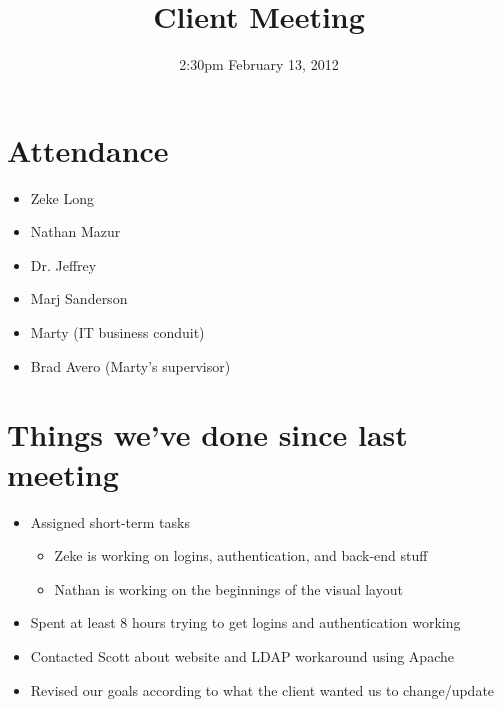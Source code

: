 \documentclass{article}
\begin{document}
\title{Client Meeting}
\date{2:30pm February 13, 2012}
\maketitle

\section{Attendance}
\begin{itemize}
\item Zeke Long
\item Nathan Mazur
\item Dr. Jeffrey
\item Marj Sanderson
\item Marty (IT business conduit)
\item Brad Avero (Marty's supervisor)
\end{itemize}

\section{Things we've done since last meeting}
\begin{itemize}
\item Assigned short-term tasks
	\begin{itemize}
	\item Zeke is working on logins, authentication, and back-end stuff
	\item Nathan is working on the beginnings of the visual layout
	\end{itemize}
\item Spent at least 8 hours trying to get logins and authentication working
\item Contacted Scott about website and LDAP workaround using Apache
\item Revised our goals according to what the client wanted us to change/update
\end{itemize}
\end{document}
